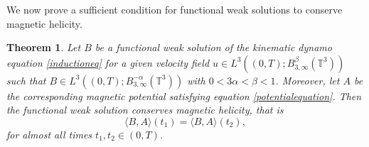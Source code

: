 \documentclass[12pt,a4paper]{article}
\newtheorem{theorem}{Theorem}[section]
\theoremstyle{definition}
\theoremstyle{remark}
\numberwithin{equation}{section}
\begin{document}
We now prove a sufficient condition for functional weak solutions to conserve magnetic helicity.
\begin{theorem}
Let $B$ be a functional weak solution of the kinematic dynamo equation \eqref{inductioneq} for a given velocity field $u \in L^3 ((0,T);B^{\beta}_{3,\infty} (\mathbb{T}^3))$ such that $B \in L^3 ((0,T);B^{-\alpha}_{3,\infty} (\mathbb{T}^3))$ with $0 < 3\alpha < \beta < 1$. Moreover, let $A$ be the corresponding magnetic potential satisfying equation \eqref{potentialequation}. Then the functional weak solution conserves magnetic helicity, that is
\begin{equation}
\langle B, A \rangle (t_1) = \langle B, A \rangle (t_2),
\end{equation}
for almost all times $t_1, t_2 \in (0,T)$. 
\end{theorem}
\end{document}
